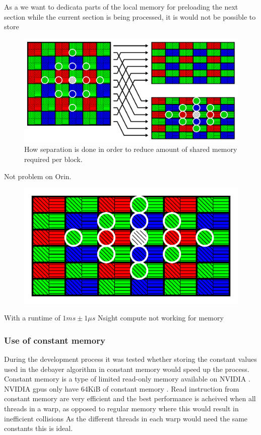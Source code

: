 As a we want to dedicata parts of the local memory for preloading the next section while the current section is being processed, it is would not be possible to store
\begin{figure}[H]
    \centering
    \includegraphics[width=\textwidth]{figures/polarized_image/separation.pdf}
    \caption{How separation is done in order to reduce amount of shared memory required per block.}
    \label{fig:saperation}
\end{figure}
Not problem on Orin.




\begin{figure}[H]
    \centering
    \includegraphics[width=.6\textwidth]{figures/polarized_image/separated_conv.pdf}
\end{figure}




With a runtime of $1 ms \pm 1 \mu s$
Nsight compute not working for memory







\subsubsection{Use of constant memory}
During the development process it was tested whether storing the constant values used in the debayer algorithm in constant memory would speed up the process.
Constant memory is a type of limited read-only memory available on NVIDIA  \cite[61]{nvidiaCUDABestPractices2023}.
NVIDIA \glspl{gpu} only have 64KiB of constant memory \cite[61]{nvidiaCUDABestPractices2023}.
Read instruction from constant memory are very efficient and the best performance is acheived when all threads in a warp, as opposed to regular memory where this would result in inefficient collisions \cite[61]{nvidiaCUDABestPractices2023} \cite[13,14]{volkovLatencyHiding2016}
As the different threads in each warp would need the same constants this is ideal.

